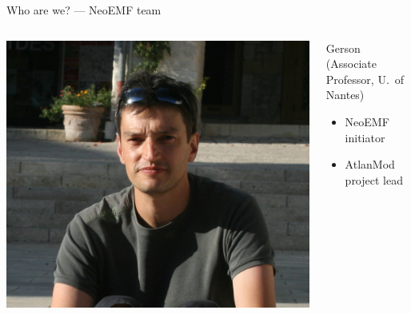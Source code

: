 \begin{frame}{Who are we? --- NeoEMF team}
\begin{columns}
\centering
\includegraphics[height=.25\textheight,clip,trim={0 3cm 0 0}]{biopic-04-gerson}
\begin{block}{Gerson (Associate Professor, U.\ of Nantes)}
\begin{itemize}
\item NeoEMF initiator
\item AtlanMod project lead
\end{itemize}
\end{block}
\end{columns}

\end{frame}

